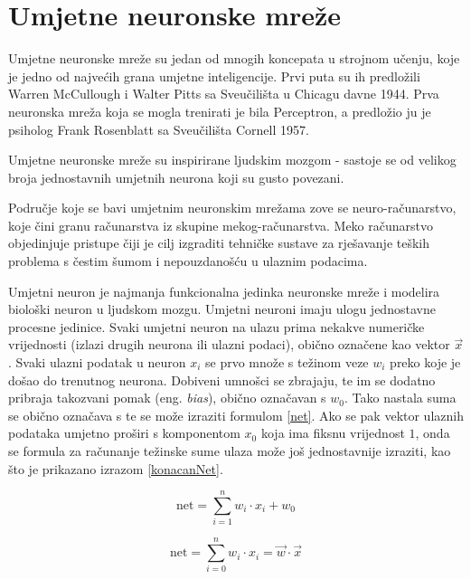 \documentclass[zavrsnirad]{fer}
\begin{document}
\chapter{Umjetne neuronske mreže}
\label{pog:NeuronskeMreze}
	
	Umjetne neuronske mreže su jedan od mnogih koncepata u strojnom učenju, koje je jedno od najvećih grana umjetne inteligencije. Prvi puta su ih predložili Warren McCullough i Walter Pitts sa Sveučilišta u Chicagu davne 1944. Prva neuronska mreža koja se mogla trenirati je bila Perceptron, a predložio ju je psiholog Frank Rosenblatt sa Sveučilišta Cornell 1957. \cite{MITNeuralNet}
	
	Umjetne neuronske mreže su inspirirane ljudskim mozgom - sastoje se od velikog broja jednostavnih umjetnih neurona koji su gusto povezani. \cite{MITNeuralNet}
	
	Područje koje se bavi umjetnim neuronskim mrežama zove se neuro-računarstvo, koje čini granu računarstva iz skupine mekog-računarstva. Meko računarstvo objedinjuje pristupe čiji je cilj izgraditi tehničke sustave za rješavanje teških problema s čestim šumom i nepouzdanošću u ulaznim podacima. \cite{skriptaNeuronskeMreze} 
	
	Umjetni neuron je najmanja funkcionalna jedinka neuronske mreže i modelira biološki neuron u ljudskom mozgu. Umjetni neuroni imaju ulogu jednostavne procesne jedinice. Svaki umjetni neuron na ulazu prima nekakve numeričke vrijednosti (izlazi drugih neurona ili ulazni podaci), obično označene kao vektor $\vec{x}$. Svaki ulazni podatak u neuron $x_i$ se prvo množe s težinom veze $w_i$ preko koje je došao do trenutnog neurona. Dobiveni umnošci se zbrajaju, te im se dodatno pribraja takozvani pomak (eng. \textit{bias}), obično označavan s $w_0$. Tako nastala suma se obično označava s  te se može izraziti formulom \ref{net}. Ako se pak vektor ulaznih podataka umjetno proširi s komponentom $x_0$ koja ima fiksnu vrijednost $1$, onda se formula za računanje težinske sume ulaza može još jednostavnije izraziti, kao što je prikazano izrazom \ref{konacanNet}.
	
	\begin{equation}
		\label{net}
		\text{net} = \sum_{i=1}^{n} w_i \cdot x_i + w_0
	\end{equation}
	
	\begin{equation}
		\label{konacanNet}
		\text{net} = \sum_{i=0}^{n} w_i \cdot x_i = \vec{w} \cdot \vec{x}
	\end{equation}
	
\end{document}
